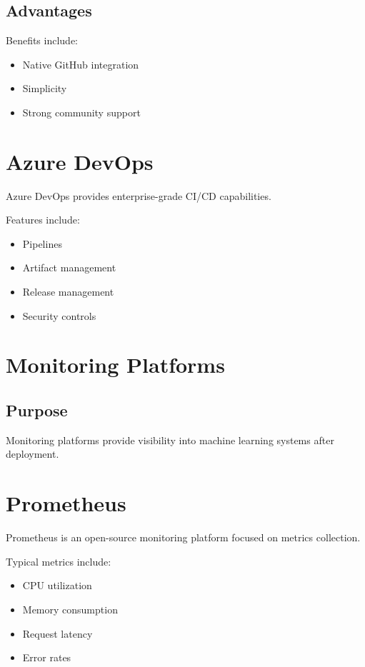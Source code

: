 \subsection{Advantages}

Benefits include:

\begin{itemize}
    \item Native GitHub integration
    \item Simplicity
    \item Strong community support
\end{itemize}

\section{Azure DevOps}

Azure DevOps provides enterprise-grade CI/CD capabilities.

Features include:

\begin{itemize}
    \item Pipelines
    \item Artifact management
    \item Release management
    \item Security controls
\end{itemize}

\section{Monitoring Platforms}

\subsection{Purpose}

Monitoring platforms provide visibility into machine learning systems after deployment.

\section{Prometheus}

Prometheus is an open-source monitoring platform focused on metrics collection.

Typical metrics include:

\begin{itemize}
    \item CPU utilization
    \item Memory consumption
    \item Request latency
    \item Error rates
\end{itemize}

